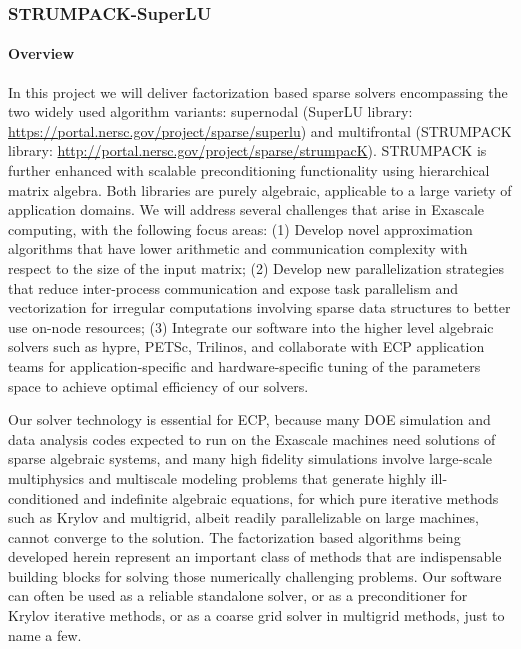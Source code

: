 \newcommand{\ignore}[1]{}
\subsubsection{ STRUMPACK-SuperLU} \label{subsubsect:strumpack}

\paragraph{Overview} 
In this project we will deliver factorization based sparse solvers
encompassing the two widely used algorithm variants: supernodal
(SuperLU library: \url{https://portal.nersc.gov/project/sparse/superlu})
and multifrontal (STRUMPACK library: \url{http://portal.nersc.gov/project/sparse/strumpacK}).
STRUMPACK is
further enhanced with scalable preconditioning functionality using
hierarchical matrix algebra. Both libraries are purely algebraic,
applicable to a large variety of application domains. We will address
several challenges that arise in Exascale computing, with the following
focus areas: 
(1) Develop novel approximation algorithms that have lower
arithmetic and communication complexity with respect to the size of the
input matrix;
(2) Develop new parallelization strategies that reduce
inter-process communication and expose task parallelism and vectorization
for irregular computations involving sparse data structures to better
use on-node resources;
(3) Integrate our software into the higher level
algebraic solvers such as hypre, PETSc, Trilinos, and collaborate with
ECP application teams for application-specific and hardware-specific tuning
of the parameters space to achieve optimal efficiency of our solvers.

Our solver technology is essential for ECP, because many DOE simulation
and data analysis codes expected to run on the Exascale machines need
solutions of sparse algebraic systems, and many high fidelity simulations
involve large-scale multiphysics and multiscale modeling problems that
generate highly ill-conditioned and indefinite algebraic equations,
for which pure iterative methods such as Krylov and multigrid, albeit
readily parallelizable on large machines, cannot converge to the solution.
The factorization based algorithms being developed herein
represent an important class of methods that are indispensable building
blocks for solving those numerically challenging problems. Our software
can often be used as a reliable standalone solver, or as a preconditioner
for Krylov iterative methods, or as a coarse grid solver in multigrid
methods, just to name a few.

